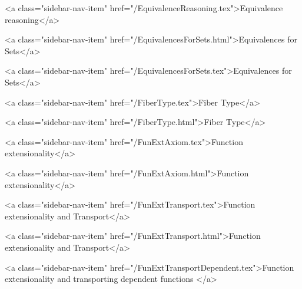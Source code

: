       
        
          <a class="sidebar-nav-item" href="/EquivalenceReasoning.tex">Equivalence reasoning</a>
        
      
    
      
        
          <a class="sidebar-nav-item" href="/EquivalencesForSets.html">Equivalences for Sets</a>
        
      
    
      
        
          <a class="sidebar-nav-item" href="/EquivalencesForSets.tex">Equivalences for Sets</a>
        
      
    
      
        
          <a class="sidebar-nav-item" href="/FiberType.tex">Fiber Type</a>
        
      
    
      
        
          <a class="sidebar-nav-item" href="/FiberType.html">Fiber Type</a>
        
      
    
      
        
          <a class="sidebar-nav-item" href="/FunExtAxiom.tex">Function extensionality</a>
        
      
    
      
        
          <a class="sidebar-nav-item" href="/FunExtAxiom.html">Function extensionality</a>
        
      
    
      
        
          <a class="sidebar-nav-item" href="/FunExtTransport.tex">Function extensionality and Transport</a>
        
      
    
      
        
          <a class="sidebar-nav-item" href="/FunExtTransport.html">Function extensionality and Transport</a>
        
      
    
      
        
          <a class="sidebar-nav-item" href="/FunExtTransportDependent.tex">Function extensionality and transporting dependent functions </a>
        
      
    
      
        
